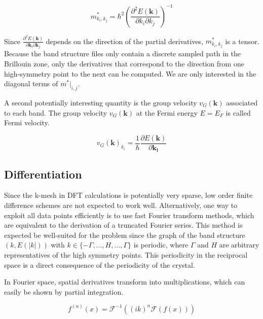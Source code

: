 \begin{equation}
    m^{*}_{k_i,k_j} = \hbar^2  \left(\frac{\partial^2E(\mathbf{k})}{\partial k_i \partial k_j}\right)^{-1}
\end{equation}

Since $\frac{\partial^2E(\mathbf{k})}{\partial \mathbf{k}_i \partial \mathbf{k}_j}$ depends on the direction of the partial derivatives, $m^{*}_{k_i,k_j}$ is a tensor. Because the band structure files only contain a discrete sampled path in the Brillouin zone, only the derivatives that correspond to the direction from one high-symmetry point to the next can be computed. We are only interested in the diagonal terms of $m^{*}\big|_{i,j}$.



A second potentially interesting quantity is the group velocity $v_{G}(\mathbf{k})$ associated to each band. The group velocity $v_{G}(\mathbf{k})$ at the Fermi energy $E = E_F$ is called Fermi velocity.

\begin{equation}
    v_{G}(\mathbf{k})_{k_i} = \frac{1}{\hbar}\frac{\partial E(\mathbf{k})}{\partial \mathbf{k_i}}
\end{equation}


\subsection{Differentiation}

Since the k-mesh in DFT calculations is potentially very sparse, low order finite difference schemes are not expected to work well. Alternatively, one way to exploit all data points efficiently is to use fast Fourier transform methods, which are equivalent to the derivation of a truncated Fourier series. This method is expected be well-suited for the problem since the graph of the band structure $(k, E(|k|))$ with $k \in \{-\Gamma,..., H,..., \Gamma\}$ is periodic, where $\Gamma$ and $H$ are arbitrary representatives of the high symmetry points. This periodicity in the reciprocal space is a direct consequence of the periodicity of the crystal.

In Fourier space, spatial derivatives transform into multiplications, which can easily be shown by partial integration.

\begin{equation}
    f^{(n)}(x) = \mathcal{F}^{-1}\left((ik)^n\mathcal{F}(f(x))\right)
\end{equation}
 
